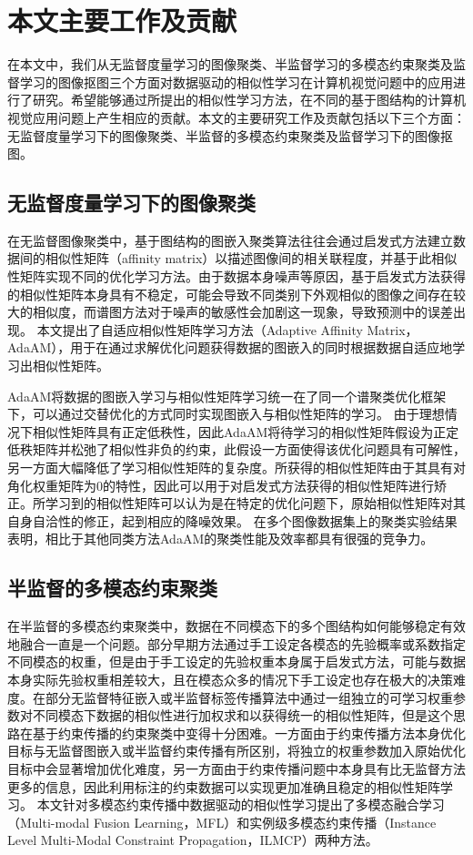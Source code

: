 \section{本文主要工作及贡献}
在本文中，我们从无监督度量学习的图像聚类、半监督学习的多模态约束聚类及监督学习的图像抠图三个方面对数据驱动的相似性学习在计算机视觉问题中的应用进行了研究。希望能够通过所提出的相似性学习方法，在不同的基于图结构的计算机视觉应用问题上产生相应的贡献。本文的主要研究工作及贡献包括以下三个方面：无监督度量学习下的图像聚类、半监督的多模态约束聚类及监督学习下的图像抠图。

\subsection{无监督度量学习下的图像聚类}
在无监督图像聚类中，基于图结构的图嵌入聚类算法往往会通过启发式方法建立数据间的相似性矩阵（affinity matrix）以描述图像间的相关联程度，并基于此相似性矩阵实现不同的优化学习方法。由于数据本身噪声等原因，基于启发式方法获得的相似性矩阵本身具有不稳定，可能会导致不同类别下外观相似的图像之间存在较大的相似度，而谱图方法对于噪声的敏感性会加剧这一现象，导致预测中的误差出现。        
本文提出了自适应相似性矩阵学习方法（Adaptive Affinity Matrix，AdaAM），用于在通过求解优化问题获得数据的图嵌入的同时根据数据自适应地学习出相似性矩阵。

AdaAM将数据的图嵌入学习与相似性矩阵学习统一在了同一个谱聚类优化框架下，可以通过交替优化的方式同时实现图嵌入与相似性矩阵的学习。
由于理想情况下相似性矩阵具有正定低秩性，因此AdaAM将待学习的相似性矩阵假设为正定低秩矩阵并松弛了相似性非负的约束，此假设一方面使得该优化问题具有可解性，另一方面大幅降低了学习相似性矩阵的复杂度。所获得的相似性矩阵由于其具有对角化权重矩阵为$0$的特性，因此可以用于对启发式方法获得的相似性矩阵进行矫正。所学习到的相似性矩阵可以认为是在特定的优化问题下，原始相似性矩阵对其自身自洽性的修正，起到相应的降噪效果。
在多个图像数据集上的聚类实验结果表明，相比于其他同类方法AdaAM的聚类性能及效率都具有很强的竞争力。

\subsection{半监督的多模态约束聚类}
在半监督的多模态约束聚类中，数据在不同模态下的多个图结构如何能够稳定有效地融合一直是一个问题。部分早期方法通过手工设定各模态的先验概率或系数指定不同模态的权重，但是由于手工设定的先验权重本身属于启发式方法，可能与数据本身实际先验权重相差较大，且在模态众多的情况下手工设定也存在极大的决策难度。在部分无监督特征嵌入或半监督标签传播算法中通过一组独立的可学习权重参数对不同模态下数据的相似性进行加权求和以获得统一的相似性矩阵\cite{wang2009unified,xu2016discriminatively,xu2014multi}，但是这个思路在基于约束传播的约束聚类中变得十分困难。一方面由于约束传播方法本身优化目标与无监督图嵌入或半监督约束传播有所区别，将独立的权重参数加入原始优化目标中会显著增加优化难度，另一方面由于约束传播问题中本身具有比无监督方法更多的信息，因此利用标注的约束数据可以实现更加准确且稳定的相似性矩阵学习。    
本文针对多模态约束传播中数据驱动的相似性学习提出了多模态融合学习（Multi-modal Fusion Learning，MFL）和实例级多模态约束传播（Instance Level Multi-Modal Constraint Propagation，ILMCP）两种方法。

